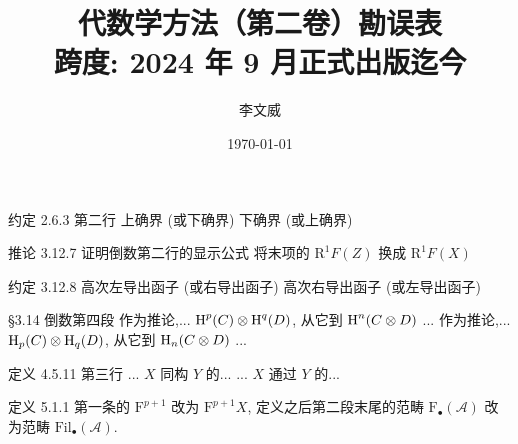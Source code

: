 \documentclass{AJerrata}
\title{\bfseries 代数学方法（第二卷）勘误表 \\ 跨度: 2024 年 9 月正式出版迄今 }
\author{李文威}
\date{\today}
\begin{document}
	\maketitle

	\begin{Errata}
		\item[约定 2.6.3 第二行]
		\Orig 上确界 (或下确界)
		\Corr 下确界 (或上确界)
		
		\item[推论 3.12.7 证明倒数第二行的显示公式]
		将末项的 $\mathrm{R}^1 F(Z)$ 换成 $\mathrm{R}^1 F(X)$
		
		\item[约定 3.12.8]
		\Orig 高次左导出函子 (或右导出函子)
		\Corr 高次右导出函子 (或左导出函子)
		
		\item[\S 3.14 倒数第四段]
		\Orig 作为推论,... $\operatorname{H}^p(C) \otimes \operatorname{H}^q(D)$, 从它到 $\operatorname{H}^n(C \otimes D)$ ...
		\Corr 作为推论,... $\operatorname{H}_p(C) \otimes \operatorname{H}_q(D)$, 从它到 $\operatorname{H}_n(C \otimes D)$ ...
		
		\item[定义 4.5.11 第三行]
		\Orig ... $X$ 同构 $Y$ 的...
		\Corr ... $X$ 通过 $Y$ 的...
		
		\item[定义 5.1.1]
		第一条的 $\mathrm{F}^{p+1}$ 改为 $\mathrm{F}^{p+1} X$, 定义之后第二段末尾的范畴 $\mathrm{F}_{\bullet}(\mathcal{A})$ 改为范畴 $\mathrm{Fil}_{\bullet}(\mathcal{A})$.
	\end{Errata}
\end{document}
